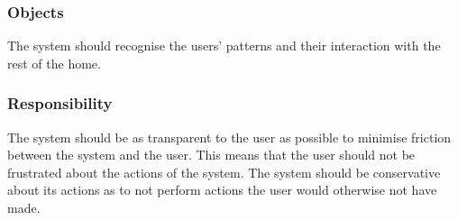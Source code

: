 \subsubsection{Objects}

The system should recognise the users' patterns and their interaction with the
rest of the home.

\subsubsection{Responsibility}

The system should be as transparent to the user as possible to minimise friction
between the system and the user. This means that the user should not be
frustrated about the actions of the system. The system should be conservative
about its actions as to not perform actions the user would otherwise not have made.